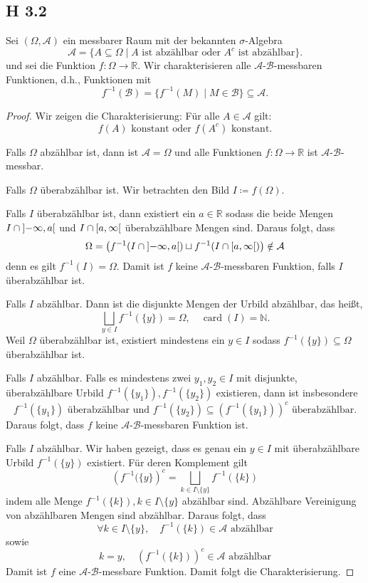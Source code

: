 \documentclass[fleqn,draft,a5paper]{article}
\theoremstyle{remark}
\DeclareMathOperator{\card}{card}
\begin{document}
\subsection{H 3.2}
Sei \((\Omega, \mathcal{A})\) ein messbarer Raum mit der bekannten \(\sigma\)-Algebra
\[\mathcal{A} = \{A \subseteq \Omega \mid A \text{ ist abzählbar oder } A^{c} \text{ ist
    abzählbar} \}.\]
und sei die Funktion \(f \colon \Omega \to \mathbb{R}\).  Wir charakterisieren alle
\(\mathcal{A}\)-\(\mathcal{B}\)-messbaren Funktionen, d.h., Funktionen mit
\[f^{-1}(\mathcal{B}) = \{f^{-1}(M) \mid M \in \mathcal{B}\} \subseteq \mathcal{A}.\]
\begin{proof}
Wir zeigen die Charakterisierung: Für alle \(A \in \mathcal{A}\) gilt:
\[f(A) \text{ konstant oder } f(A^{c}) \text{ konstant.}\]

 Falls \(\Omega\) abzählbar ist, dann ist \(\mathcal{A} = \Omega\) und alle Funktionen \(f\colon \Omega
    \to \mathbb{R}\) ist \(\mathcal{A}\)-\(\mathcal{B}\)-messbar.

 Falls \(\Omega\) überabzählbar ist. Wir betrachten den Bild \(I \coloneq f(\Omega)\).

 Falls \(I\) überabzählbar
    ist, dann existiert ein \(a \in \mathbb{R}\) sodass die beide Mengen
    \(I \cap \ointerval{-\infty}{a}\) und
    \(I \cap \rinterval{a}{\infty}\) überabzählbare Mengen sind.  Daraus folgt,
    dass
\[ \Omega = \left(f^{-1}(I \cap \ointerval{-\infty}{a}) \sqcup f^{-1}(I \cap
    \rinterval{a}{\infty})\right) \notin \mathcal{A}\] denn es gilt
\(f^{-1}(I) = \Omega\).  Damit ist \(f\) keine
\(\mathcal{A}\)-\(\mathcal{B}\)-messbaren Funktion, falls \(I\) überabzählbar ist.

 Falls \(I\) abzählbar.  Dann ist die disjunkte
Mengen der Urbild abzählbar, das heißt,
\[\bigsqcup_{y \in I}{f^{-1}(\{y\})} = \Omega, \quad \card(I) = \mathbb{N}.\]
Weil \(\Omega\) überabzählbar ist, existiert mindestens ein \(y \in I\) sodass
\(f^{-1}(\{y\}) \subseteq \Omega\) überabzählbar ist.

 Falls \(I\) abzählbar. Falls es mindestens zwei  \(y_{1}, y_{2} \in I\) mit disjunkte, überabzählbare
Urbild \(f^{-1}(\{y_{1}\}), f^{-1}(\{y_{2}\})\) existieren, dann
ist insbesondere
\[f^{-1}(\{y_{1}\}) \text{ überabzählbar und } f^{-1}(\{y_{2}\}) \subseteq
  \left(f^{-1}(\{y_{1}\})\right)^{c} \text{ überabzählbar.}\] Daraus
folgt, dass \(f\)
keine \(\mathcal{A}\)-\(\mathcal{B}\)-messbaren Funktion ist.

 Falls \(I\) abzählbar. Wir haben gezeigt, dass es genau ein
  \(y \in I\) mit überabzählbare Urbild \(f^{-1}(\{y\})\) existiert. Für
  deren Komplement gilt
\[\left(f^{-1}(\{y\}\right)^{c} = \bigsqcup_{k \in I \setminus
    \{y\}}{f^{-1}(\{k\})}\] indem alle Menge
\(f^{-1}(\{k\}), k \in I \setminus \{y\}\) abzählbar sind.  Abzählbare Vereinigung
von abzählbaren Mengen sind abzählbar.  Daraus folgt, dass
\[ \forall k \in I \setminus \{y\}, \quad f^{-1}(\{k\}) \in \mathcal{A} \text{ abzählbar} \]
sowie
\[ k = y, \quad \left(f^{-1}(\{k\})\right)^{c} \in \mathcal{A} \text{ abzählbar}\] Damit
ist \(f\) eine \(\mathcal{A}\)-\(\mathcal{B}\)-messbare Funktion.  Damit folgt die Charakterisierung.
\end{proof}
\end{document}
